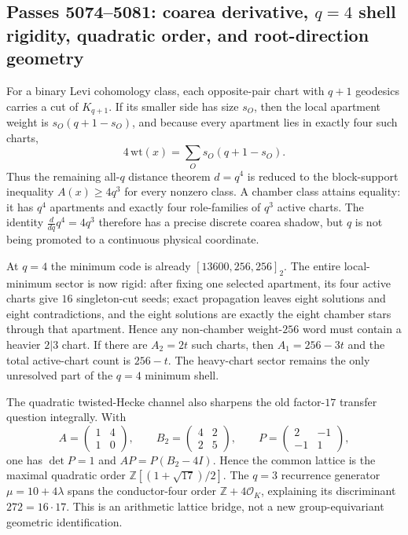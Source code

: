 \ifdefined\WPassFiveZeroSevenFourLoaded\else
\gdef\WPassFiveZeroSevenFourLoaded{1}
\subsection*{Passes 5074--5081: coarea derivative, $q=4$ shell rigidity, quadratic order, and root-direction geometry}
For a binary Levi cohomology class, each opposite-pair chart with $q+1$ geodesics carries a cut of $K_{q+1}$.  If its smaller side has size $s_O$, then the local apartment weight is $s_O(q+1-s_O)$, and because every apartment lies in exactly four such charts,
\[
 4\,\mathrm{wt}(x)=\sum_O s_O(q+1-s_O).
\]
Thus the remaining all-$q$ distance theorem $d=q^4$ is reduced to the block-support inequality $A(x)\ge4q^3$ for every nonzero class.  A chamber class attains equality: it has $q^4$ apartments and exactly four role-families of $q^3$ active charts.  The identity $\frac{d}{dq}q^4=4q^3$ therefore has a precise discrete coarea shadow, but $q$ is not being promoted to a continuous physical coordinate.

At $q=4$ the minimum code is already $[13600,256,256]_2$.  The entire local-minimum sector is now rigid: after fixing one selected apartment, its four active charts give $16$ singleton-cut seeds; exact propagation leaves eight solutions and eight contradictions, and the eight solutions are exactly the eight chamber stars through that apartment.  Hence any non-chamber weight-$256$ word must contain a heavier $2|3$ chart.  If there are $A_2=2t$ such charts, then $A_1=256-3t$ and the total active-chart count is $256-t$.  The heavy-chart sector remains the only unresolved part of the $q=4$ minimum shell.

The quadratic twisted-Hecke channel also sharpens the old factor-$17$ transfer question integrally.  With
\[
 A=\begin{pmatrix}1&4\\1&0\end{pmatrix},\qquad
 B_2=\begin{pmatrix}4&2\\2&5\end{pmatrix},\qquad
 P=\begin{pmatrix}2&-1\\-1&1\end{pmatrix},
\]
one has $\det P=1$ and $AP=P(B_2-4I)$.  Hence the common lattice is the maximal quadratic order $\mathbb Z[(1+\sqrt{17})/2]$.  The $q=3$ recurrence generator $\mu=10+4\lambda$ spans the conductor-four order $\mathbb Z+4\mathcal O_K$, explaining its discriminant $272=16\cdot17$.  This is an arithmetic lattice bridge, not a new group-equivariant geometric identification.

